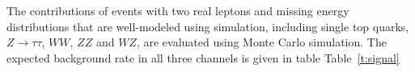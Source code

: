 
The contributions of events with two real leptons and missing energy
distributions that are well-modeled using simulation, including
single top quarks, $Z \to \tau\tau$, $WW$, $ZZ$ and $WZ$, are evaluated
using Monte Carlo simulation.
The expected background rate in all three channels is given in table Table~\ref{t:signal}



%
%



